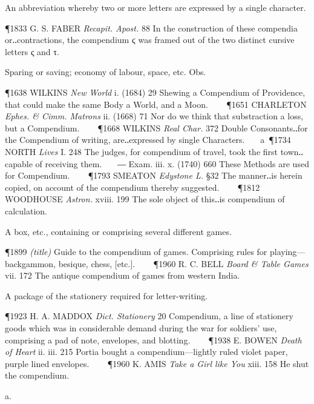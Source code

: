 \begin{description}[wide, labelwidth=!, labelindent=0pt]
\begin{myenumerate}
 An abbreviation whereby two or more letters are expressed by a single character.

\P 1833 G. S. FABER  \textit{Recapit. Apost.} 88 In the construction of these compendia or‥contractions, the compendium ϛ was framed out of the two distinct cursive letters ς and τ.

 Sparing or saving; economy of labour, space, etc. Obs.

\P 1638 WILKINS  \textit{New World} i. (1684) 29 Shewing a Compendium of Providence, that could make the same Body a World, and a Moon.    
\P 1651 CHARLETON  \textit{Ephes. \& Cimm. Matrons} ii. (1668) 71 Nor do we think that substraction a loss, but a Compendium.    
\P 1668 WILKINS  \textit{Real Char.} 372 Double Consonants‥for the Compendium of writing, are‥expressed by single Characters.    a 
\P 1734 NORTH  \textit{Lives} I. 248 The judges, for compendium of travel, took the first town‥capable of receiving them.    ― Exam. iii. x. (1740) 660 These Methods are used for Compendium.    
\P 1793 SMEATON  \textit{Edystone L.} §32 The manner‥is herein copied, on account of the compendium thereby suggested.    
\P 1812 WOODHOUSE  \textit{Astron.} xviii. 199 The sole object of this‥is compendium of calculation.

 A box, etc., containing or comprising several different games.

\P 1899 \textit{(title)}  Guide to the compendium of games. Comprising rules for playing—backgammon, besique, chess, [etc.].    
\P 1960 R. C. BELL  \textit{Board \& Table Games} vii. 172 The antique compendium of games from western India.

 A package of the stationery required for letter-writing.

\P 1923 H. A. MADDOX  \textit{Dict. Stationery} 20 Compendium, a line of stationery goods which was in considerable demand during the war for soldiers' use, comprising a pad of note, envelopes, and blotting.    
\P 1938 E. BOWEN  \textit{Death of Heart} ii. iii. 215 Portia bought a compendium—lightly ruled violet paper, purple lined envelopes.    
\P 1960 K. AMIS  \textit{Take a Girl like You} xiii. 158 He shut the compendium.
\end{myenumerate}


 a.

\noindent {}

\vspace{-0.3cm}


\end{description}
